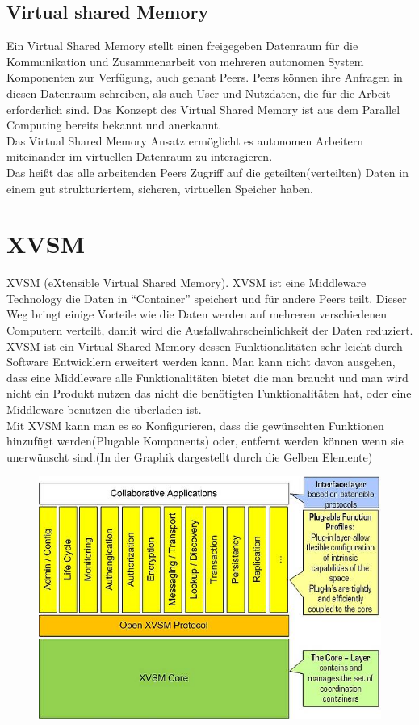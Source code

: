 \documentclass[a4paper,12pt]{scrreprt}
\begin{document}
			
			
						
			\subsection{Virtual shared Memory}
			
			
			Ein Virtual Shared Memory stellt einen freigegeben Datenraum für die Kommunikation und Zusammenarbeit von mehreren autonomen System Komponenten zur Verfügung, auch genant Peers. Peers können ihre Anfragen in diesen Datenraum schreiben, als auch User und Nutzdaten, die für die Arbeit erforderlich sind.
			Das Konzept des Virtual Shared Memory ist aus dem Parallel Computing bereits bekannt und anerkannt.\\
			Das Virtual Shared Memory Ansatz ermöglicht es autonomen Arbeitern miteinander im virtuellen Datenraum zu interagieren.\\
			Das heißt das alle arbeitenden Peers  Zugriff auf die geteilten(verteilten) Daten in einem gut strukturiertem, sicheren, virtuellen Speicher haben.
			 
			
			
			  
		
		\section{XVSM}
		XVSM (eXtensible Virtual Shared Memory). XVSM ist eine Middleware Technology die Daten in “Container” speichert  und für andere Peers teilt. Dieser Weg bringt einige Vorteile wie die Daten werden auf mehreren verschiedenen Computern verteilt, damit wird die Ausfallwahrscheinlichkeit der Daten reduziert.\\
		
		XVSM ist ein Virtual Shared Memory dessen Funktionalitäten sehr leicht durch Software Entwicklern erweitert werden kann. Man kann nicht davon ausgehen, dass eine Middleware alle Funktionalitäten bietet die man braucht und man wird nicht ein Produkt nutzen das nicht die benötigten Funktionalitäten hat, oder eine Middleware benutzen die überladen ist.\\
		Mit XVSM kann man es so Konfigurieren, dass die gewünschten Funktionen hinzufügt werden(Plugable Komponents) oder, entfernt werden können wenn sie unerwünscht sind.(In der Graphik dargestellt durch die Gelben Elemente)\\
		\begin{figure}[h]
			\centering
			\includegraphics[width=0.7\linewidth]{./08570620af}
			\caption{}
			\label{fig:08570620af}
		\end{figure}
\end{document}
